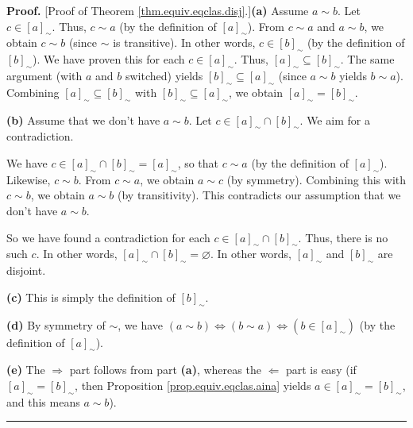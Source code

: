 \documentclass[numbers=enddot,12pt,final,onecolumn,notitlepage]{scrartcl}%
\numberwithin{exer}{subsection}
\theoremstyle{definition}
\newenvironment{proof}[1][Proof]{\noindent\textbf{#1.} }{\ \rule{0.5em}{0.5em}}
\begin{document}
\begin{proof}
[Proof of Theorem \ref{thm.equiv.eqclas.disj}.]\textbf{(a)} Assume $a\sim b$.
Let $c\in\left[  a\right]  _{\sim}$. Thus, $c\sim a$ (by the definition of
$\left[  a\right]  _{\sim}$). From $c\sim a$ and $a\sim b$, we obtain $c\sim
b$ (since $\sim$ is transitive). In other words, $c\in\left[  b\right]
_{\sim}$ (by the definition of $\left[  b\right]  _{\sim}$). We have proven
this for each $c\in\left[  a\right]  _{\sim}$. Thus, $\left[  a\right]
_{\sim}\subseteq\left[  b\right]  _{\sim}$. The same argument (with $a$ and
$b$ switched) yields $\left[  b\right]  _{\sim}\subseteq\left[  a\right]
_{\sim}$ (since $a\sim b$ yields $b\sim a$). Combining $\left[  a\right]
_{\sim}\subseteq\left[  b\right]  _{\sim}$ with $\left[  b\right]  _{\sim
}\subseteq\left[  a\right]  _{\sim}$, we obtain $\left[  a\right]  _{\sim
}=\left[  b\right]  _{\sim}$.

\textbf{(b)} Assume that we don't have $a\sim b$. Let $c\in\left[  a\right]
_{\sim}\cap\left[  b\right]  _{\sim}$. We aim for a contradiction.

We have $c\in\left[  a\right]  _{\sim}\cap\left[  b\right]  _{\sim}=\left[
a\right]  _{\sim}$, so that $c\sim a$ (by the definition of $\left[  a\right]
_{\sim}$). Likewise, $c\sim b$. From $c\sim a$, we obtain $a\sim c$ (by
symmetry). Combining this with $c\sim b$, we obtain $a\sim b$ (by
transitivity). This contradicts our assumption that we don't have $a\sim b$.

So we have found a contradiction for each $c\in\left[  a\right]  _{\sim}%
\cap\left[  b\right]  _{\sim}$. Thus, there is no such $c$. In other words,
$\left[  a\right]  _{\sim}\cap\left[  b\right]  _{\sim}=\varnothing$. In other
words, $\left[  a\right]  _{\sim}$ and $\left[  b\right]  _{\sim}$ are disjoint.

\textbf{(c)} This is simply the definition of $\left[  b\right]  _{\sim}$.

\textbf{(d)} By symmetry of $\sim$, we have $\left(  a\sim b\right)
\Longleftrightarrow\left(  b\sim a\right)  \Longleftrightarrow\left(
b\in\left[  a\right]  _{\sim}\right)  $ (by the definition of $\left[
a\right]  _{\sim}$).

\textbf{(e)} The $\Longrightarrow$ part follows from part \textbf{(a)},
whereas the $\Longleftarrow$ part is easy (if $\left[  a\right]  _{\sim
}=\left[  b\right]  _{\sim}$, then Proposition \ref{prop.equiv.eqclas.aina}
yields $a\in\left[  a\right]  _{\sim}=\left[  b\right]  _{\sim}$, and this
means $a\sim b$).
\end{proof}
\end{document}
